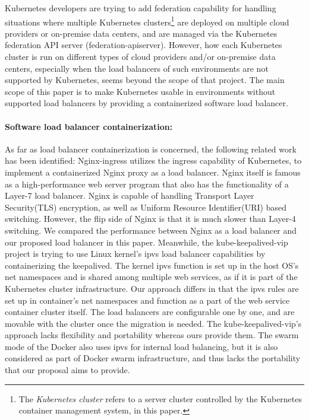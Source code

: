 Kubernetes developers are trying to add federation\cite{K8sFederation2017} capability for handling situations 
where multiple Kubernetes clusters\footnote{The {\em Kubernetes cluster} refers to a server cluster 
controlled by the Kubernetes container management system, in this paper.} 
are deployed on multiple cloud providers or on-premise data centers, 
and are managed via the Kubernetes federation API server (federation-apiserver). 
However, how each Kubernetes cluster is run on different types of cloud providers
and/or on-premise data centers, especially when the load balancers of such environments are not supported by Kubernetes, 
seems beyond the scope of that project. 
The main scope of this paper is to make Kubernetes usable in environments 
without supported load balancers by providing a containerized software load balancer.

\paragraph{\bf Software load balancer containerization:}
As far as load balancer containerization is concerned, the following related work has been identified:
Nginx-ingress\cite{Pleshakov2016,NginxInc2016} utilizes the ingress\cite{K8sIngress2017} capability of Kubernetes, 
to implement a containerized Nginx proxy as a load balancer. Nginx itself is famous as a high-performance web server program
that also has the functionality of a Layer-7 load balancer. Nginx is capable of handling Transport Layer Security(TLS) encryption, 
as well as Uniform Resource Identifier(URI) based switching. However, the flip side of Nginx is that it is much slower than Layer-4 switching.
We compared the performance between Nginx as a load balancer and our proposed load balancer in this paper.
%
Meanwhile, the kube-keepalived-vip\cite{Prashanth2016} project is trying to use Linux kernel's ipvs\cite{Zhang2000} 
load balancer capabilities by containerizing the keepalived\cite{ACassen2016}.
The kernel ipvs function is set up in the host OS's net namespaces and is shared among multiple web services,
as if it is part of the Kubernetes cluster infrastructure.
Our approach differs in that the ipvs rules are set up in container's net namespaces 
and function as a part of the web service container cluster itself.
The load balancers are configurable one by one, and are  movable with the cluster once the migration is needed.
The kube-keepalived-vip's approach lacks flexibility and portability whereas ours provide them.
%
The swarm mode of the Docker\cite{DockerCoreEngineering2016,DockerInc2017} also uses ipvs for internal load balancing,
but it is also considered as part of Docker swarm infrastructure, 
and thus lacks the portability that our proposal aims to provide.

